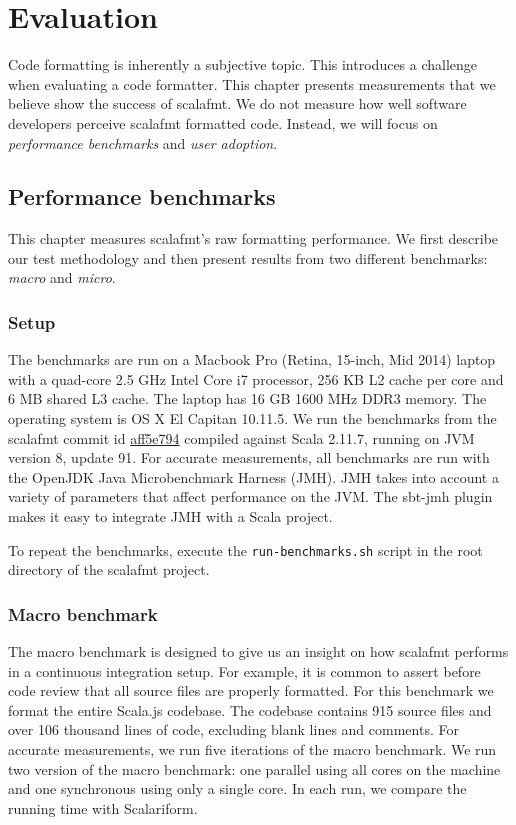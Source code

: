 \section{Evaluation}\label{sec:evaluation}
Code formatting is inherently a subjective topic.
This introduces a challenge when evaluating a code formatter.
This chapter presents measurements that we believe show the success of scalafmt.
We do not measure how well software developers perceive scalafmt formatted code.
Instead, we will focus on \emph{performance benchmarks} and \emph{user adoption}.

\subsection{Performance benchmarks}
This chapter measures scalafmt's raw formatting performance.
We first describe our test methodology and then present results from two different benchmarks: \emph{macro} and \emph{micro}.

\subsubsection{Setup}
The benchmarks are run on a Macbook Pro (Retina, 15-inch, Mid 2014) laptop with a quad-core 2.5 GHz Intel Core i7 processor, 256 KB L2 cache per core and 6 MB shared L3 cache.
The laptop has 16 GB 1600 MHz DDR3 memory.
The operating system is OS X El Capitan 10.11.5.
We run the benchmarks from the scalafmt commit id \href{https://github.com/olafurpg/scalafmt/tree/aff5e794dae4787b08243f8abb87a3ca4d907e40}{aff5e794} compiled against Scala 2.11.7, running on JVM version 8, update 91.
For accurate measurements, all benchmarks are run with the OpenJDK Java Microbenchmark Harness (JMH)\autocite{OpenJ38:online}.
JMH takes into account a variety of parameters that affect performance on the JVM.
The sbt-jmh\autocite{ktoso84:online} plugin makes it easy to integrate JMH with a Scala project.

To repeat the benchmarks, execute the \texttt{run-benchmarks.sh} script in the root directory of the scalafmt project.

\subsubsection{Macro benchmark}
The macro benchmark is designed to give us an insight on how scalafmt performs in a continuous integration setup.
For example, it is common to assert before code review that all source files are properly formatted.
For this benchmark we format the entire Scala.js codebase.
The codebase contains 915 source files and over 106 thousand lines of code, excluding blank lines and comments.
For accurate measurements, we run five iterations of the macro benchmark.
We run two version of the macro benchmark: one parallel using all cores on the machine and one synchronous using only a single core.
In each run, we compare the running time with Scalariform.


